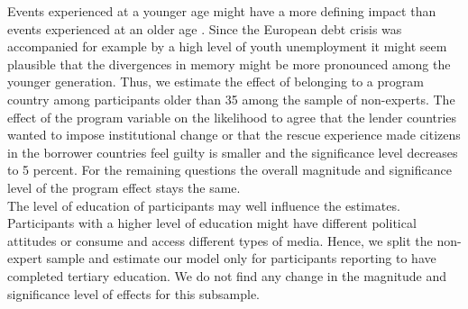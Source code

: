  Events experienced at a younger age might have a more defining impact than events experienced at an older age \cite{baumeister}. Since the European debt crisis was accompanied for example by a high level of youth unemployment it might seem plausible that the divergences in memory might be more pronounced among the younger generation. Thus, we estimate the effect of belonging to a program country among participants older than 35 among the sample of non-experts.  The effect of the program variable on the likelihood to agree that the lender countries wanted to impose institutional change or that the rescue experience made citizens in the borrower countries feel guilty is smaller and the significance level decreases to 5 percent. For the remaining questions the overall magnitude and significance level of the program effect stays the same. 
\\
The level of education of participants may well influence the estimates. Participants with a higher level of education might have different political attitudes or consume and access different types of media. Hence, we split the non-expert sample and estimate our model only for participants reporting to have completed tertiary education. We do not find any change in the magnitude and significance level of effects for this subsample. 
\\
